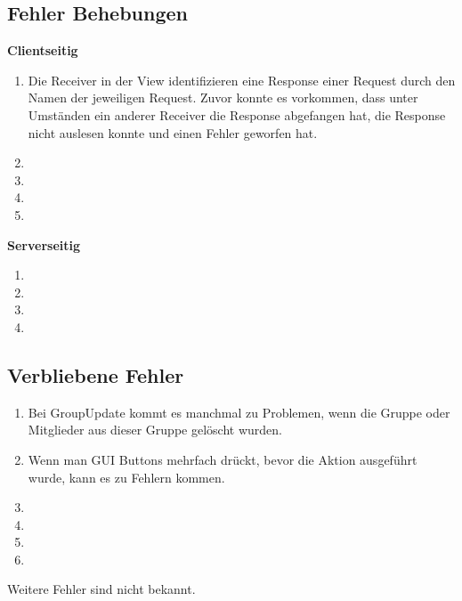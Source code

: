 \subsection{Fehler Behebungen}
	\textbf{Clientseitig}
	\begin{enumerate}
		\item Die Receiver in der View identifizieren eine Response einer Request durch den Namen der jeweiligen Request. Zuvor konnte es vorkommen, dass unter Umständen ein anderer Receiver die Response abgefangen hat, die Response nicht auslesen konnte und einen Fehler geworfen hat. 
		\item 
		\item
		\item
		\item
	\end{enumerate}
	
	\textbf{Serverseitig}
	\begin{enumerate}
		\item 
		\item
		\item
		\item
	\end{enumerate}

\subsection{Verbliebene Fehler}
	\begin{enumerate}
		\item Bei GroupUpdate kommt es manchmal zu Problemen, wenn die Gruppe oder Mitglieder aus dieser Gruppe gelöscht wurden.
		\item Wenn man GUI Buttons mehrfach drückt, bevor die Aktion ausgeführt wurde, kann es zu Fehlern kommen.
		\item
		\item
		\item
		\item
	\end{enumerate}

	Weitere Fehler sind nicht bekannt.